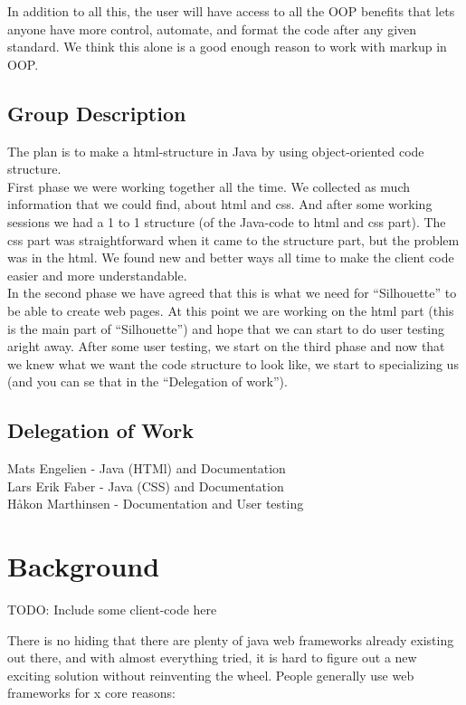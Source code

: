 \documentclass[12pt]{article}
\begin{document}
In addition to all this, the user will have access to all the OOP benefits that lets anyone have more control, automate, and format the code after any given standard. We think this alone is a good enough reason to work with markup in OOP.

    \subsection{Group Description}
    The plan is to make a html-structure in Java by using object-oriented code structure.\\
    First phase we were working together all the time. We collected as much information that we could find, about html and css. And after some working sessions we had a 1 to 1 structure (of the Java-code to html and css part). The css part was straightforward when it came to the structure part, but the problem was in the html. We found new and better ways all time to make the client code easier and more understandable.\\
    In the second phase we have agreed that this is what we need for “Silhouette” to be able to create web pages. At this point we are working on the html part (this is the main part of “Silhouette”) and hope that we can start to do user testing aright away. After some user testing, we start on the third phase and now that we knew what we want the code structure to look like, we start to specializing us (and you can se that in the “Delegation of work”). 

    \subsection{Delegation of Work}
    Mats Engelien - Java (HTMl) and Documentation\\
    Lars Erik Faber - Java (CSS) and Documentation\\
    Håkon Marthinsen - Documentation and User testing

\section{Background}
TODO: Include some client-code here

There is no hiding that there are plenty of java web frameworks already existing out there, and with almost everything tried, it is hard to figure out a new exciting solution without reinventing the wheel. People generally use web frameworks for x core reasons:
\end{document}
